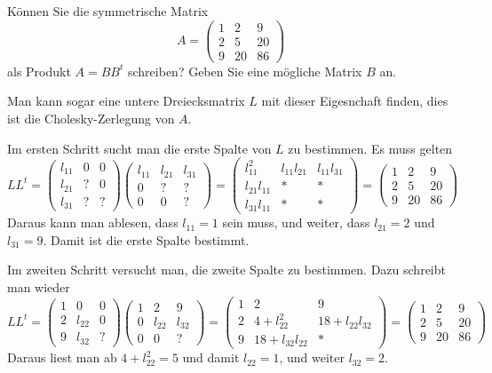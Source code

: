 Können Sie die symmetrische Matrix
\[
A=\begin{pmatrix}
1& 2& 9\\
2& 5&20\\
9&20&86
\end{pmatrix}
\]
als Produkt $A=BB^t$ schreiben? Geben Sie eine mögliche Matrix $B$ an.


\begin{loesung}
Man kann sogar eine untere Dreiecksmatrix $L$ mit dieser Eigesnchaft finden,
dies ist die Cholesky-Zerlegung von $A$.

Im ersten Schritt sucht man die erste Spalte von $L$ zu bestimmen.
Es muss gelten
\[
LL^t=
\begin{pmatrix}
l_{11}&  0&  0\\
l_{21}&  ?&  0\\
l_{31}&  ?&  ?
\end{pmatrix}
\begin{pmatrix}
l_{11}&l_{21}&l_{31}\\
     0&     ?&     ?\\
     0&     0&     ?
\end{pmatrix}
=
\begin{pmatrix}
    l_{11}^2&l_{11}l_{21}&l_{11}l_{31}\\
l_{21}l_{11}&           *&           *\\
l_{31}l_{11}&           *&           *
\end{pmatrix}
=
\begin{pmatrix}
1& 2& 9\\
2& 5&20\\
9&20&86
\end{pmatrix}
\]
Daraus kann man ablesen, dass $l_{11}=1$ sein muss, und weiter,
dass
$l_{21}=2$ und $l_{31}=9$. Damit ist die erste Spalte bestimmt.

Im zweiten Schritt versucht man, die zweite Spalte zu bestimmen.
Dazu schreibt man wieder
\[
LL^t
=
\begin{pmatrix}
1&     0&0\\
2&l_{22}&0\\
9&l_{32}&?
\end{pmatrix}
\begin{pmatrix}
1&     2&     9\\
0&l_{22}&l_{32}\\
0&     0&?
\end{pmatrix}
=
\begin{pmatrix}
1&2           &           9\\
2&4+l_{22}^2  &18+l_{22}l_{32}\\
9&18+l_{32}l_{22}&         *
\end{pmatrix}
=
\begin{pmatrix}
1& 2& 9\\
2& 5&20\\
9&20&86
\end{pmatrix}
\]
Daraus liest man ab $4+l_{22}^2=5$ und damit $l_{22}=1$, und weiter
$l_{32}=2$.


\end{loesung}

